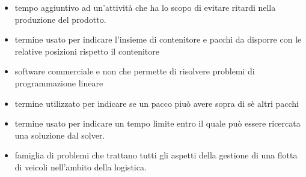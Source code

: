 \begin{itemize}
	\item {} tempo aggiuntivo ad un'attività che ha lo scopo di evitare ritardi nella produzione del prodotto.
	\item {}  termine usato per indicare l'insieme di contenitore e pacchi da disporre con le relative posizioni rispetto il contenitore
	\item {} software commerciale e non che permette di risolvere problemi di programmazione lineare
	\item {} termine utilizzato per indicare se un pacco piuò avere sopra di sè altri pacchi
	\item {} termine usato per indicare un tempo limite entro il quale può essere ricercata una soluzione dal solver.
	\item {} famiglia di problemi che trattano tutti gli aspetti della gestione di una flotta di veicoli nell'ambito della logistica.
\end{itemize} 
